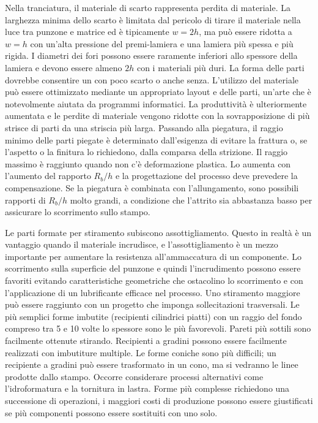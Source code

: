 Nella tranciatura, il materiale di scarto rappresenta perdita di materiale. La larghezza minima
dello scarto è limitata dal pericolo di tirare il materiale nella luce tra punzone e matrice ed è
tipicamente $w = 2h$, ma può essere ridotta a $w = h$ con un'alta pressione del premi-lamiera e
una lamiera più spessa e più rigida.
I diametri dei fori possono essere raramente inferiori allo spessore della lamiera e devono
essere almeno $2h$ con i materiali più duri. La forma delle parti dovrebbe consentire un
 con poco scarto o anche senza.
L'utilizzo del materiale può essere ottimizzato mediante un appropriato layout e  delle
parti, un'arte che è notevolmente aiutata da programmi informatici. La produttività è
ulteriormente aumentata e le perdite di materiale vengono ridotte con la sovrapposizione di
più strisce di parti da una striscia più larga.
Passando alla piegatura, il raggio minimo delle parti piegate è determinato dall'esigenza di
evitare la frattura o, se l'aspetto o la finitura lo richiedono, dalla comparsa della strizione.
Il raggio massimo è raggiunto quando non c'è deformazione plastica. Lo 
aumenta con l'aumento del rapporto $R_b/h$ e la progettazione del processo deve prevedere
la compensazione.
Se la piegatura è combinata con l'allungamento, sono possibili rapporti di $R_b/h$ molto grandi,
a condizione che l'attrito sia abbastanza basso per assicurare lo scorrimento sullo stampo.

Le parti formate per stiramento subiscono assottigliamento. Questo in realtà è un vantaggio
quando il materiale incrudisce, e l'assottigliamento è un mezzo importante per aumentare
la resistenza all'ammaccatura di un componente. Lo scorrimento sulla superficie del
punzone e quindi l'incrudimento possono essere favoriti evitando caratteristiche
geometriche che ostacolino lo scorrimento e con l'applicazione di un lubrificante efficace nel
processo. Uno stiramento maggiore può essere raggiunto con un progetto che imponga
sollecitazioni trasversali.
Le più semplici forme imbutite (recipienti cilindrici piatti) con un raggio del fondo compreso
tra 5 e 10 volte lo spessore sono le più favorevoli. Pareti più sottili sono facilmente ottenute
stirando. Recipienti a gradini possono essere facilmente realizzati con imbutiture multiple.
Le forme coniche sono più difficili; un recipiente a gradini può essere trasformato in un cono,
ma si vedranno le linee prodotte dallo stampo. Occorre considerare processi alternativi
come l'idroformatura e la tornitura in lastra. Forme più complesse richiedono una
successione di operazioni, i maggiori costi di produzione possono essere giustificati se più
componenti possono essere sostituiti con uno solo.

